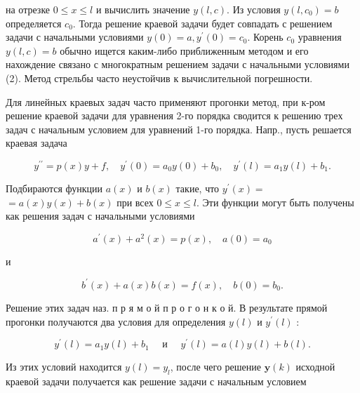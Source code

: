 \documentclass[10pt]{article}
\begin{document}
на отрезке $0 \leqslant x \leqslant l$ и вычислить значение $y(l, c)$. Из условия $y\left(l, c_{0}\right)=b$ определяется $c_{0}$. Тогда решение краевой задачи будет совпадать с решением задачи с начальными условиями $y(0)=a, y^{\prime}(0)=c_{0}$. Корень $c_{0}$ уравнения $y(l, c)=b$ обычно ищется каким-либо приближенным методом и его нахождение связано с многократным решением задачи с начальными условиями (2). Метод стрельбы часто неустойчив к вычислительной погрешности.



Для линейных краевых задач часто применяют прогонки метод, при к-ром решение краевой задачи для уравнения 2-го порядка сводится к решению трех задач с начальным условием для уравнений 1-го порядка. Напр., пусть решается краевая задача



\[

y^{\prime \prime}=p(x) y+f, \quad y^{\prime}(0)=a_{0} y(0)+b_{0}, \quad y^{\prime}(l)=a_{1} y(l)+b_{1} .

\]



Подбираются функции $a(x)$ и $b(x)$ такие, что $y^{\prime}(x)=$ $=a(x) y(x)+b(x)$ при всех $0 \leqslant x \leqslant l$. Эти функции могут быть получены как решения задач с начальными условиями



\[

a^{\prime}(x)+a^{2}(x)=p(x), \quad a(0)=a_{0}

\]



и



\[

b^{\prime}(x)+a(x) b(x)=f(x), \quad b(0)=b_{0} .

\]



Решение этих задач наз. п р я м о й п р о г о н к о й. В результате прямой прогонки получаются два условия для определения $y(l)$ и $y^{\prime}(l)$ :



\[

y^{\prime}(l)=a_{1} y(l)+b_{1} \quad \text { и } \quad y^{\prime}(l)=a(l) y(l)+b(l) .

\]



Из этих условий находится $y(l)=y_{l}$, после чего решение $\boldsymbol{y}(k)$ исходной краевой задачи получается как решение задачи с начальным условием
\end{document}
